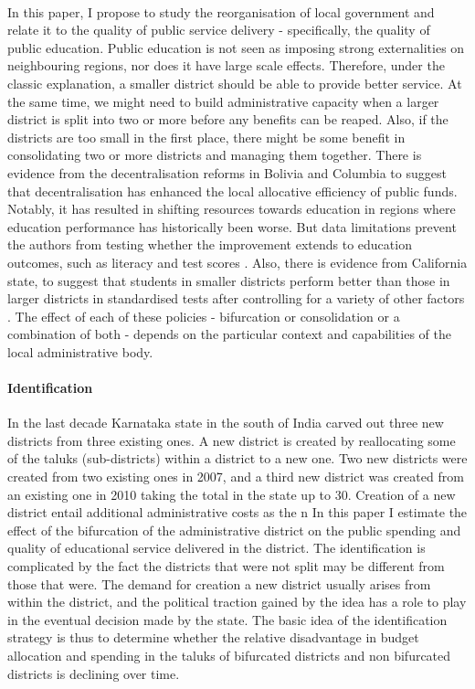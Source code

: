 \documentclass[12pt, a4paper]{article}
\begin{document}
\paragraph{}In this paper, I propose to study the reorganisation of local government and relate it to the quality of public service delivery - specifically, the quality of public education. Public education is not seen as imposing strong externalities on neighbouring regions, nor does it have large scale effects. Therefore, under the classic explanation, a smaller district should be able to provide better service. At the same time, we might need to build administrative capacity when a larger district is split into two or more before any benefits can be reaped. Also, if the districts are too small in the first place, there might be some benefit in consolidating two or more districts and managing them together. There is evidence from the decentralisation reforms in Bolivia and Columbia to suggest that decentralisation has enhanced the local allocative efficiency of public funds. Notably, it has resulted in shifting resources towards education in regions where education performance has historically been worse. But data limitations prevent the authors from testing whether the improvement extends to education outcomes, such as literacy and test scores \parencite{faguet2008decentralization}. Also, there is evidence from California state, to suggest that students in smaller districts perform better than those in larger districts in standardised tests after controlling for a variety of other factors \parencite{driscoll2003school}.
The effect of each of these policies - bifurcation or consolidation or a combination of both - depends on the particular context and capabilities of the local administrative body. 
\paragraph{Identification} In the last decade Karnataka state in the south of India carved out three new districts from three existing ones. A new district is created by reallocating some of the taluks (sub-districts) within a district to a new one. Two new districts were created from two existing ones in 2007, and a third new district was created from an existing one in 2010 taking the total in the state up to 30. Creation of a new district entail additional administrative costs as the n In this paper I estimate the effect of the bifurcation of the administrative district on the public spending and quality of educational service delivered in the district. The identification is complicated by the fact the districts that were not split may be different from those that were. The demand for creation a new district usually arises from within the district, and the political traction gained by the idea has a role to play in the eventual decision made by the state. The basic idea of the identification strategy is thus to determine whether the relative disadvantage in budget allocation and spending in the taluks of bifurcated districts and non bifurcated districts is declining over time.
\end{document}
